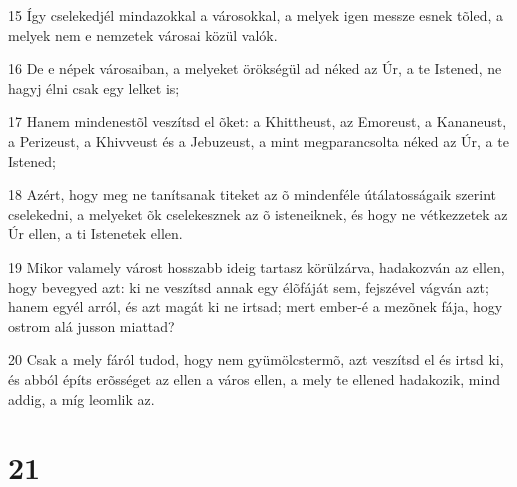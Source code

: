 \par 15 Így cselekedjél mindazokkal a városokkal, a melyek igen messze esnek tõled, a melyek nem e nemzetek városai közül valók.
\par 16 De e népek városaiban, a melyeket örökségül ad néked az Úr, a te Istened, ne hagyj élni csak egy lelket is;
\par 17 Hanem mindenestõl veszítsd el õket: a Khittheust, az Emoreust, a Kananeust, a Perizeust, a Khivveust és a Jebuzeust, a mint megparancsolta néked az Úr, a te Istened;
\par 18 Azért, hogy meg ne tanítsanak titeket az õ mindenféle útálatosságaik szerint cselekedni, a melyeket õk cselekesznek az õ isteneiknek, és hogy ne vétkezzetek az Úr ellen, a ti  Istenetek ellen.
\par 19 Mikor valamely várost hosszabb ideig tartasz körülzárva, hadakozván az ellen, hogy bevegyed azt: ki ne veszítsd annak egy élõfáját sem, fejszével vágván azt; hanem egyél arról, és azt magát ki ne irtsad; mert ember-é a mezõnek fája, hogy ostrom alá jusson miattad?
\par 20 Csak a mely fáról tudod, hogy nem gyümölcstermõ, azt veszítsd el és irtsd ki, és abból építs erõsséget az ellen a város ellen, a mely te ellened hadakozik, mind addig, a míg leomlik az.

\chapter{21}

